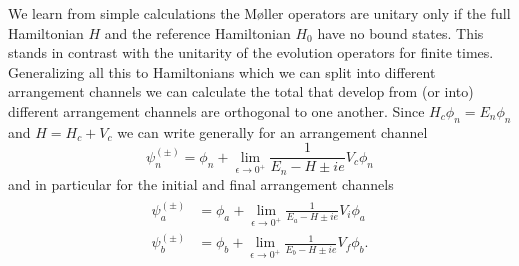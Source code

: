 \documentclass[11pt]{article}
\numberwithin{equation}{section}
\begin{document}
We learn from simple calculations the M\o ller operators are unitary only if the full Hamiltonian $H$ and the reference Hamiltonian $H_0$ have no bound states. This stands in contrast with the unitarity of the evolution operators for finite times.\\
Generalizing all this to Hamiltonians which we can split into different arrangement channels we can calculate the total that develop from (or into) different arrangement channels are orthogonal to one another. Since $H_c \phi_n = E_n \phi_n$ and $H = H_c + V_c$ we can write generally for an arrangement channel
\begin{equation}
	\psi^{(\pm)}_n = \phi_n + \underset{\epsilon \rightarrow 0^+} \lim \frac{1}{E_{n} - H \pm ie} V_c \phi_{n}
\end{equation}
and in particular for the initial and final arrangement channels
\begin{align}\label{initialfinal}
\begin{split}
	\psi^{(\pm)}_a &= \phi_a + \underset{\epsilon \rightarrow 0^+} \lim \frac{1}{E_{a} - H \pm ie} V_i \phi_{a}\\
	\psi^{(\pm)}_b &= \phi_b + \underset{\epsilon \rightarrow 0^+} \lim \frac{1}{E_{b} - H \pm ie} V_f \phi_{b}.\\
\end{split}
\end{align}
\end{document}
